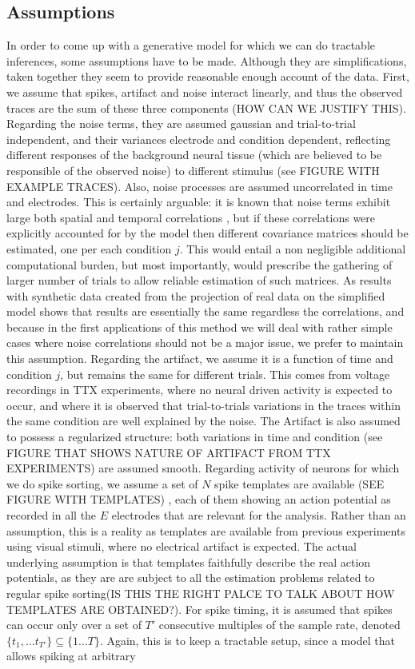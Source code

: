 \documentclass[12pt,letterpaper,fleqn]{article}
\begin{document}
\subsection{Assumptions}
In order to come up with a generative model for which we can do tractable inferences, some assumptions have to be made. Although they are simplifications, taken together they seem to provide reasonable enough account of the data. First, we assume that spikes, artifact and noise interact linearly, and thus the observed traces are the sum of these three components (HOW CAN WE JUSTIFY THIS). Regarding the noise terms, they are assumed gaussian and trial-to-trial independent, and their variances electrode and condition dependent, reflecting different responses of the background neural tissue (which are believed to be responsible of the observed noise) to different stimulus (see FIGURE WITH EXAMPLE TRACES). Also, noise processes are assumed uncorrelated in time and electrodes. This is certainly arguable: it is known that noise terms exhibit large both spatial and temporal correlations \cite{PillowEtal13}, but if these correlations were explicitly accounted for by the model then different covariance matrices should be estimated, one per each condition $j$. This would entail a non negligible additional computational burden, but most importantly, would prescribe the gathering of larger number of trials to allow reliable estimation of such matrices. As results with synthetic data created from the projection of real data on the simplified model shows that results are essentially the same regardless the correlations, and because in the first applications of this method we will deal with rather simple cases where noise correlations should not be a major issue, we prefer to maintain this assumption. Regarding the artifact, we assume it is a function of time and condition $j$, but remains the same for different trials. This comes from voltage recordings in TTX experiments, where no neural driven activity is expected to occur, and where it is observed that trial-to-trials variations in the traces within the same condition are well explained by the noise. The Artifact is also assumed to possess a regularized structure: both variations in time and condition (see FIGURE THAT SHOWS NATURE OF ARTIFACT FROM TTX EXPERIMENTS) are assumed smooth. Regarding activity of neurons for which we do spike sorting, we assume a set of $N$ spike templates are available (SEE FIGURE WITH TEMPLATES) , each of them showing an action potential as recorded in all the $E$ electrodes that are relevant for the analysis. Rather than an assumption, this is a reality as templates are available from previous experiments using visual stimuli, where no electrical artifact is expected. The actual underlying assumption is that templates faithfully describe the real action potentials, as they are are subject to all the estimation problems related to regular spike sorting(IS THIS THE RIGHT PALCE TO TALK ABOUT HOW TEMPLATES ARE OBTAINED?). For spike timing, it is assumed that spikes can occur only over a set of $T'$ consecutive multiples of the sample rate, denoted $\{t_1,\ldots t_{T'}\}\subseteq \{1\ldots T\}$. Again, this is to keep a tractable setup, since a model that allows spiking at arbitrary 
\end{document}
